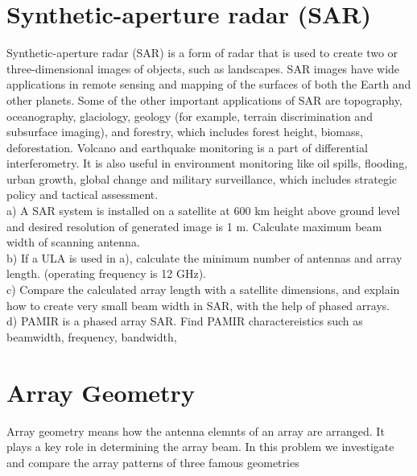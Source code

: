 \documentclass[paper=a4, fontsize=11pt]{scrartcl} %
\numberwithin{equation}{section} %
\numberwithin{figure}{section} %
\numberwithin{table}{section} %
\begin{document}
    \section{Synthetic-aperture radar (SAR)} 
Synthetic-aperture radar (SAR) is a form of radar that is used to create two or three-dimensional images of objects, such as landscapes. SAR images have wide applications in remote sensing and mapping of the surfaces of both the Earth and other planets. Some of the other important applications of SAR are topography, oceanography, glaciology, geology (for example, terrain discrimination and subsurface imaging), and forestry, which includes forest height, biomass, deforestation. Volcano and earthquake monitoring is a part of differential interferometry. It is also useful in environment monitoring like oil spills, flooding, urban growth, global change and military surveillance, which includes strategic policy and tactical assessment.\\


a) A SAR system is installed on a satellite at 600 km height above ground level and desired resolution of generated image is 1 m. Calculate maximum beam width of scanning antenna.\\

b) If a ULA is used in a), calculate the minimum number of antennas and array length. (operating frequency is 12 GHz).\\

c) Compare the calculated array length with a satellite dimensions, and explain how to create very small beam width in SAR, with the help of phased arrays.\\

d) PAMIR is a phased array SAR. Find PAMIR charactereistics such as beamwidth, frequency, bandwidth, 

    \section{Array Geometry} 
Array geometry means how the antenna elemnts of an array are arranged. It plays a key role in determining the array beam. In this problem we investigate and compare the array patterns of three famous geometries\\
\end{document}
